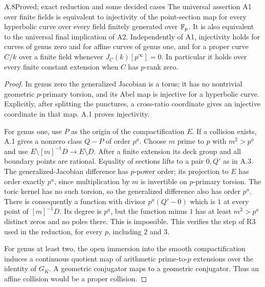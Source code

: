 \begin{claim}{A.8}{Proved; exact reduction and some decided cases}
The universal assertion A1 over finite fields is equivalent to
injectivity of the point-section map for every hyperbolic curve
over every field finitely generated over $\mathbb F_p$. It is also
equivalent to the universal final implication of A2. Independently
of A1, injectivity holds for curves of genus zero and for affine
curves of genus one, and for a proper curve $C/k$ over a finite
field whenever $J_C(k)[p^\infty]=0$. In particular it holds over
every finite constant extension when $C$ has $p$-rank zero.
\end{claim}
\begin{proof}
In genus zero the generalized Jacobian is a torus; it has no
nontrivial geometric $p$-primary torsion, and its Abel map is
injective for a hyperbolic curve. Explicitly, after splitting the
punctures, a cross-ratio coordinate gives an injective coordinate
in that map. A.1 proves injectivity.

For genus one, use $P$ as the origin of the compactification $E$.
If a collision exists, A.1 gives a nonzero class $Q-P$ of order
$p^a$. Choose $m$ prime to $p$ with $m^2>p^a$ and use
$E\setminus[m]^{-1}D\to E\setminus D$.
After a finite extension its deck group and all boundary points
are rational. Equality of sections lifts to a pair $0,Q'$ as in
A.3. The generalized-Jacobian difference has $p$-power order;
its projection to $E$ has order exactly $p^a$, since multiplication
by $m$ is invertible on $p$-primary torsion. The toric kernel has
no such torsion, so the generalized difference also has order
$p^a$. There is consequently a function with divisor
$p^a(Q'-0)$ which is $1$ at every point of $[m]^{-1}D$.
Its degree is $p^a$, but the function minus $1$ has at least
$m^2>p^a$ distinct zeros and no poles there. This is impossible.
This verifies the step of R3 used in the reduction, for every $p$,
including $2$ and $3$.

For genus at least two, the open immersion into the smooth
compactification induces a continuous quotient map of arithmetic
prime-to-$p$ extensions over the identity of $G_K$. A geometric
conjugator maps to a geometric conjugator. Thus an affine collision
would be a proper collision.


\end{proof}
